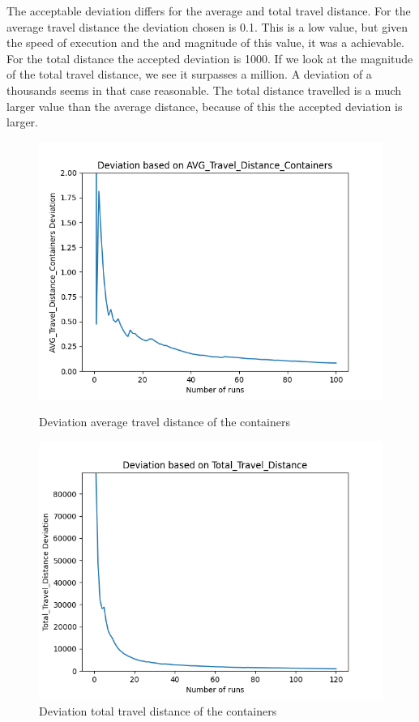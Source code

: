 \documentclass[]{article}
\begin{document}
The acceptable deviation differs for the average and total travel distance. For
the average travel distance the deviation chosen is 0.1. This is a low value,
but given the speed of execution and the and magnitude of this value, it was a
achievable. For the total distance the accepted deviation is 1000. If we look
at the magnitude of the total travel distance, we see it surpasses a million. A
deviation of a thousands seems in that case reasonable. The total distance
travelled is a much larger value than the average distance, because of this the
accepted deviation is larger.

\begin{figure}[!tbp]
	\centering
	\begin{minipage}[b]{0.44\textwidth}
		\includegraphics[width=\textwidth]{Afbeeldingen/deviation_avg_distance.png}
		\caption{Deviation average travel distance of the containers}\label{fig:deviation}
	\end{minipage}
	\hfill
	\begin{minipage}[b]{0.44\textwidth}
		\includegraphics[width=\textwidth]{Afbeeldingen/deviation_total_distance.png}
		\caption{Deviation total travel distance of the containers}
	\end{minipage}
\end{figure}
\end{document}
